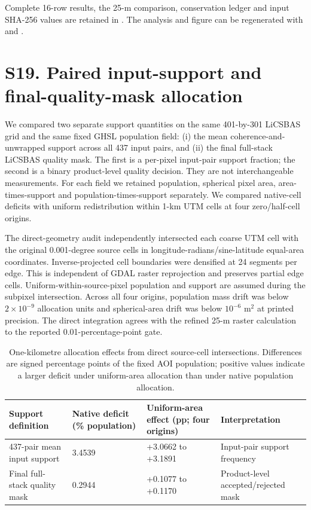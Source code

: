 \documentclass[10pt,a4paper]{article}
\begin{document}
Complete 16-row results, the 25-m comparison, conservation ledger and input SHA-256 values are retained in . The analysis and figure can be regenerated with  and .


\section*{S19. Paired input-support and final-quality-mask allocation}
We compared two separate support quantities on the same 401-by-301 LiCSBAS grid and the same fixed GHSL population field: (i) the mean coherence-and-unwrapped support across all 437 input pairs, and (ii) the final full-stack LiCSBAS quality mask. The first is a per-pixel input-pair support fraction; the second is a binary product-level quality decision. They are not interchangeable measurements. For each field we retained population, spherical pixel area, area-times-support and population-times-support separately. We compared native-cell deficits with uniform redistribution within 1-km UTM cells at four zero/half-cell origins.

The direct-geometry audit independently intersected each coarse UTM cell with the original 0.001-degree source cells in longitude-radians/sine-latitude equal-area coordinates. Inverse-projected cell boundaries were densified at 24 segments per edge. This is independent of GDAL raster reprojection and preserves partial edge cells. Uniform-within-source-pixel population and support are assumed during the subpixel intersection. Across all four origins, population mass drift was below $2\times10^{-9}$ allocation units and spherical-area drift was below $10^{-6}$ m$^2$ at printed precision. The direct integration agrees with the refined 25-m raster calculation to the reported 0.01-percentage-point gate.

\begin{table}[htbp]\centering\scriptsize
\caption{One-kilometre allocation effects from direct source-cell intersections. Differences are signed percentage points of the fixed AOI population; positive values indicate a larger deficit under uniform-area allocation than under native population allocation.}
\begin{tabular}{p{2.5cm}p{2.2cm}p{3.8cm}p{4.0cm}}\toprule
Support definition & Native deficit (\% population) & Uniform-area effect (pp; four origins) & Interpretation\\\midrule
437-pair mean input support & 3.4539 & +3.0662 to +3.1891 & Input-pair support frequency\\
Final full-stack quality mask & 0.2944 & +0.1077 to +0.1170 & Product-level accepted/rejected mask\\\bottomrule
\end{tabular}
\end{table}
\end{document}

